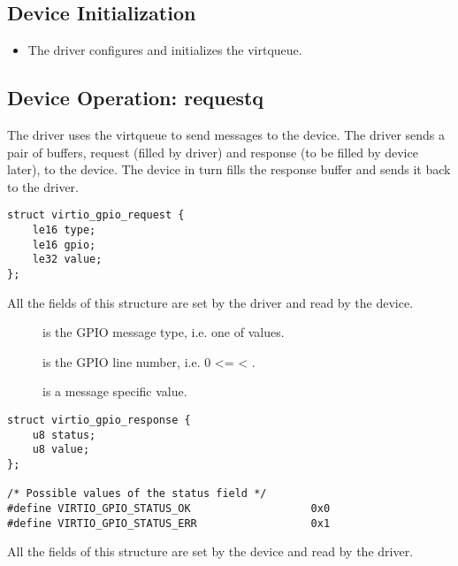 \subsection{Device Initialization}\label{sec:Device Types / GPIO Device / Device Initialization}

\begin{itemize}
\item The driver configures and initializes the  virtqueue.
\end{itemize}

\subsection{Device Operation: requestq}\label{sec:Device Types / GPIO Device / requestq Operation}

The driver uses the  virtqueue to send messages to the device.
The driver sends a pair of buffers, request (filled by driver) and response (to
be filled by device later), to the device. The device in turn fills the response
buffer and sends it back to the driver.

\begin{lstlisting}
struct virtio_gpio_request {
    le16 type;
    le16 gpio;
    le32 value;
};
\end{lstlisting}

All the fields of this structure are set by the driver and read by the device.

\begin{description}
\item[] is the GPIO message type, i.e. one of
     values.

\item[] is the GPIO line number, i.e. 0 <=  <
    .

\item[] is a message specific value.
\end{description}

\begin{lstlisting}
struct virtio_gpio_response {
    u8 status;
    u8 value;
};

/* Possible values of the status field */
#define VIRTIO_GPIO_STATUS_OK                   0x0
#define VIRTIO_GPIO_STATUS_ERR                  0x1
\end{lstlisting}

All the fields of this structure are set by the device and read by the driver.

